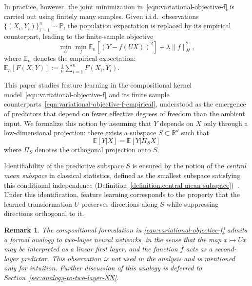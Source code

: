 \documentclass[sn-mathphys-num]{sn-jnl}%
\numberwithin{equation}{section}
\newcommand{\R}{\mathbb{R}}
\newcommand{\E}{\mathbb{E}}
\theoremstyle{thmstyleone}%
\theoremstyle{thmstyletwo}%
\newtheorem{remark}{Remark}%
\theoremstyle{thmstylethree}%
\begin{document}
In practice, however, the joint minimization in~\eqref{eqn:variational-objective-f}
is carried out using finitely many samples. Given i.i.d.\ observations
$\{(X_i,Y_i)\}_{i=1}^n \sim \mathbb P$, the population expectation is replaced by
its empirical counterpart, leading to the finite-sample objective
\begin{equation}
\label{eqn:variational-objective-f-empirical}
	\min_U \min_f \E_n[(Y - f(U X))^2]  + \lambda \|f\|_H^2,
\end{equation}
where $\E_n$ denotes the empirical expectation: $\E_n [F(X, Y)] := \frac{1}{n} \sum_{i=1}^n F(X_i, Y_i)$.


This paper studies feature learning in the compositional kernel model~\eqref{eqn:variational-objective-f} 
and its finite sample counterparts~\eqref{eqn:variational-objective-f-empirical},
understood as the emergence of predictors that depend on fewer effective 
degrees of freedom than the ambient input. We formalize this notion by assuming that $Y$
 depends on $X$ only through a low-dimensional projection:
there exists a subspace $S \subset \R^d$ such that
\begin{equation}
\label{eqn:subspace-low-dimension}
	\mathbb{E}[Y | X] = \E[Y| \Pi_S X]
\end{equation} 
where $\Pi_S$ denotes the orthogonal projection onto $S$. 

Identifiability of the predictive subspace $S$ is ensured by the notion of the 
\emph{central mean subspace} in classical statistics, defined as the smallest subspace satisfying this 
conditional independence (Definition~\ref{definition:central-mean-subspace})~\cite{CookLi02}. Under this identification, feature learning 
corresponds to the property that the learned transformation $U$ preserves 
directions along $S$ while suppressing directions orthogonal to it.





\vspace{.5em} 
\begin{remark} 
\emph{
The compositional formulation in
\eqref{eqn:variational-objective-f} admits a formal analogy to two-layer neural networks, 
in the sense that the map $x \mapsto Ux$ may  be interpreted as a linear first layer, and the function $f$ acts 
as a second-layer predictor. This observation is not used in the analysis and is mentioned 
only for \emph{intuition}. 
Further discussion of this analogy is deferred to Section~\ref{sec:analogy-to-two-layer-NN}.
}
\end{remark} 
\end{document}
